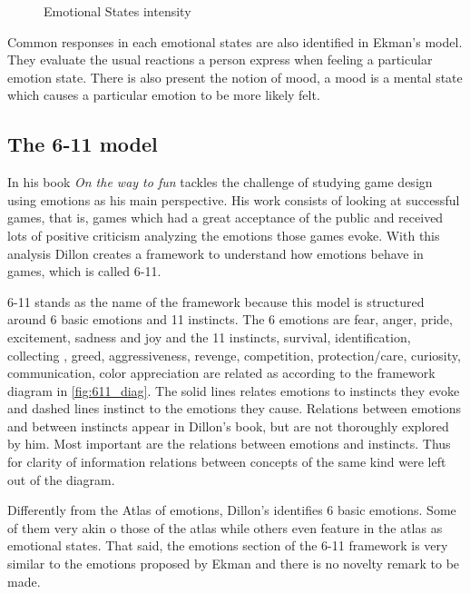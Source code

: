 \begin{figure}[ht]
    \caption{Emotional States intensity}
    \label{fig:emotionalstates}
\end{figure}


Common responses in each emotional states are also identified in Ekman's model. They evaluate the usual reactions a person express when feeling a particular emotion state. There is also present the notion of mood, a mood is a mental state which causes a particular emotion to be more likely felt.


\FloatBarrier
\subsection{The 6-11 model}

In his book \textit{On the way to fun} \citeauthor{dillon_way_2010} tackles the challenge of studying game design using emotions as his main perspective. His work consists of looking at successful games, that is, games which had a great acceptance of the public and received lots of positive criticism analyzing the emotions those games evoke. With this analysis Dillon creates a framework to understand how emotions behave in games, which is called 6-11.

6-11 stands as the name of the framework because this model is structured around 6 basic emotions and 11 instincts. The 6 emotions are fear, anger, pride, excitement, sadness and joy and the 11 instincts, survival, identification, collecting
, greed, aggressiveness, revenge, competition, protection/care, curiosity, communication, color appreciation are related as according to the framework diagram in \autoref{fig:611_diag}. The solid lines relates emotions to instincts they evoke and dashed lines instinct to the emotions they cause. Relations between emotions and between instincts appear in Dillon's book, but are not thoroughly explored by him. Most important are the relations between emotions and instincts. Thus for clarity of information relations between concepts of the same kind were left out of the diagram. 




Differently from the Atlas of emotions, Dillon's identifies 6 basic emotions. Some of them very akin o those of the atlas while others even feature in the atlas as emotional states. That said, the emotions section of the 6-11 framework is very similar to the emotions proposed by Ekman and there is no novelty remark to be made.

